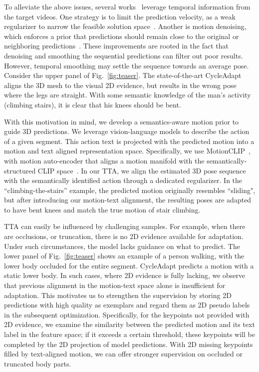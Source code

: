 {To alleviate the above issues, several works~\cite{dynaboa,cycleadapt} leverage temporal information from the target videos.
One strategy is to limit the 
prediction velocity, 
as a weak regularizer to narrow the feasible solution space~\cite{dynaboa}.
Another is motion denoising, which enforces a prior that predictions should remain close to the original or neighboring predictions~\cite{cycleadapt}.
These improvements are rooted in the fact that denoising and smoothing the sequential predictions can filter out poor results. 
However, temporal smoothing may settle the sequence towards an average pose. 
Consider the upper panel of Fig.~\ref{fig:teaser}. 
The state-of-the-art CycleAdapt~\cite{cycleadapt} aligns the 3D mesh 
to the visual 2D evidence, but results in the wrong pose where the legs are straight. 
With some semantic knowledge of the man's activity (climbing stairs), it is clear that his knees should be bent.  

With this motivation in mind, we develop a semantics-aware motion prior to guide 3D predictions. 
We leverage vision-language models to describe the action of a given segment.  This action text is projected with the predicted motion into a motion and text aligned representation space.  Specifically, we use MotionCLIP~\cite{motionclip}, with motion auto-encoder that aligns a motion manifold with the semantically-structured CLIP space~\cite{clip}.  In our TTA, we align the estimated 3D pose sequence with the semantically identified action through a dedicated regularizer. 
In the ``climbing-the-stairs'' example, the predicted motion originally resembles ``sliding", but after introducing our motion-text alignment, the resulting poses are adapted to have bent knees and match the true motion of stair climbing. 

{TTA can easily be influenced by challenging samples. For example, when there are occlusions, or truncation, there is no 2D evidence available for adaptation. Under such circumstances, the model lacks guidance on what to predict.
}
The lower panel of Fig.~\ref{fig:teaser} shows an example of a person walking, with the lower body occluded for the entire segment. CycleAdapt predicts a motion with a static lower body.
In such cases, where 2D evidence is fully lacking, we observe that previous alignment in the motion-text space alone is insufficient for adaptation.  This motivates us to strengthen the supervision by storing 2D predictions with high quality as exemplars and regard them as 2D pseudo labels in the subsequent optimization. 
Specifically, for the keypoints not provided with 2D evidence, we
examine the similarity between the predicted motion and its text label in the feature space; if it exceeds a certain threshold, these keypoints will be completed by the 2D projection of model predictions.
With 2D missing keypoints filled by text-aligned motion, we can offer stronger supervision on occluded or truncated body parts.



}
